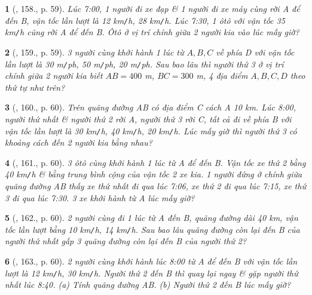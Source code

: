 \documentclass{article}
\newtheorem{baitoan}{}
\begin{document}
\begin{baitoan}[\cite{Binh_Toan_6_tap_2}, 158., p. 59]
	Lúc {\rm7:00}, 1 người đi xe đạp \& 1 người đi xe máy cùng rời A để đến B, vận tốc lần lượt là {\rm12 km{\tt/}h, 28 km{\tt/}h}. Lúc {\rm7:30}, 1 ôtô với vận tốc {\rm35 km{\tt/}h} cũng rời A để đến B. Ôtô ở vị trí chính giữa 2 người kia vào lúc mấy giờ?
\end{baitoan}

\begin{baitoan}[\cite{Binh_Toan_6_tap_2}, 159., p. 59]
	3 người cùng khởi hành 1 lúc từ $A,B,C$ về phía D với vận tốc lần lượt là {\rm30 m{\tt/}ph, 50 m{\tt/}ph, 20 m{\tt/}ph}. Sau bao lâu thì người thứ 3 ở vị trí chính giữa 2 người kia biết $AB = 400$ {\rm m}, $BC = 300$ {\rm m}, 4 địa điểm $A,B,C,D$ theo thứ tự như trên?
\end{baitoan}

\begin{baitoan}[\cite{Binh_Toan_6_tap_2}, 160., p. 60]
	Trên quãng đường AB có địa điểm C cách A {\rm10 km}. Lúc {\rm8:00}, người thứ nhất \& người thứ 2 rời A, người thứ 3 rời C, tất cả đi về phía B với vận tốc lần lượt là {\rm30 km{\tt/}h, 40 km{\tt/}h, 20 km{\tt/}h}. Lúc mấy giờ thì người thứ 3 có khoảng cách đến 2 người kia bằng nhau?
\end{baitoan}

\begin{baitoan}[\cite{Binh_Toan_6_tap_2}, 161., p. 60]
	3 ôtô cùng khởi hành 1 lúc từ A để đến B. Vận tốc xe thứ 2 bằng {\rm40 km{\tt/}h} \& bằng trung bình cộng của vận tốc 2 xe kia. 1 người đứng ở chính giữa quãng đường AB thấy xe thứ nhất đi qua lúc {\rm7:06}, xe thứ 2 đi qua lúc {\rm7:15}, xe thứ 3 đi qua lúc {\rm7:30}. 3 xe khởi hành từ A lúc mấy giờ?
\end{baitoan}

\begin{baitoan}[\cite{Binh_Toan_6_tap_2}, 162., p. 60]
	2 người cùng đi 1 lúc từ A đến B, quãng đường dài {\rm40 km}, vận tốc lần lượt bằng {\rm10 km{\tt/}h, 14 km{\tt/}h}. Sau bao lâu quãng đường còn lại đến B của người thứ nhất gấp 3 quãng đường còn lại đến B của người thứ 2?
\end{baitoan}

\begin{baitoan}[\cite{Binh_Toan_6_tap_2}, 163., p. 60]
	2 người cùng khởi hành lúc {\rm8:00} từ A để đến B với vận tốc lần lượt là {\rm12 km{\tt/}h, 30 km{\tt/}h}. Người thứ 2 đến B thì quay lại ngay \& gặp người thứ nhất lúc {\rm8:40}. (a) Tính quãng đường AB. (b) Người thứ 2 đến B lúc mấy giờ?
\end{baitoan}
\end{document}
